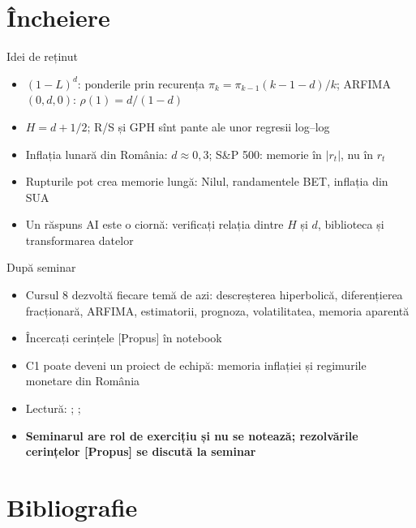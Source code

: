 \section{Încheiere}

\begin{frame}{Idei de reținut}
\itemsize{\small}
\begin{itemize}
    \item $(1-L)^d$: ponderile prin recurența $\pi_k = \pi_{k-1}(k-1-d)/k$; ARFIMA$(0,d,0)$: $\rho(1) = d/(1-d)$
    \item $H = d + 1/2$; R/S și GPH sînt pante ale unor regresii log--log
    \item Inflația lunară din România: $d \approx 0{,}3$; S\&P 500: memorie în $|r_t|$, nu în $r_t$
    \item Rupturile pot crea memorie lungă: Nilul, randamentele BET, inflația din SUA
    \item Un răspuns AI este o ciornă: verificați relația dintre $H$ și $d$, biblioteca și transformarea datelor
\end{itemize}
\end{frame}

\begin{frame}{După seminar}
\itemsize{\small}
\begin{itemize}
    \item Cursul 8 dezvoltă fiecare temă de azi: descreșterea hiperbolică, diferențierea fracționară, ARFIMA, estimatorii, prognoza, volatilitatea, memoria aparentă
    \item Încercați cerințele [Propus] în notebook
    \item C1 poate deveni un proiect de echipă: memoria inflației și regimurile monetare din România
    \item Lectură: ; ; 
    \item \textbf{Seminarul are rol de exercițiu și nu se notează; rezolvările cerințelor [Propus] se discută la seminar}
\end{itemize}
\end{frame}


\section{Bibliografie}


